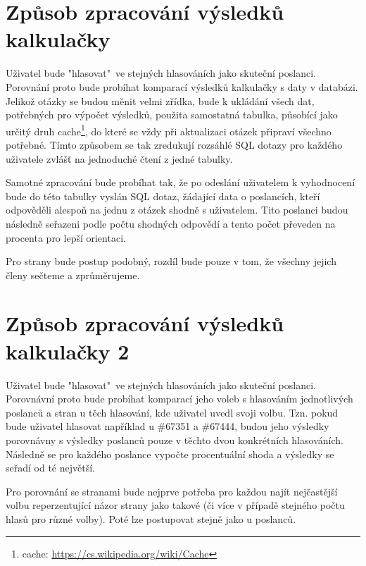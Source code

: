 \section{Způsob zpracování výsledků kalkulačky}
Uživatel bude "hlasovat"\ ve stejných hlasováních jako skuteční poslanci. Porovnání proto bude probíhat komparací výsledků kalkulačky s daty v databázi. Jelikož otázky se budou měnit velmi zřídka, bude k ukládání všech dat, potřebných pro výpočet výsledků, použita samostatná tabulka, působící jako určitý druh cache\footnote{cache: \url{https://cs.wikipedia.org/wiki/Cache}}, do které se vždy při aktualizaci otázek připraví všechno potřebné. Tímto způsobem se tak zredukují rozsáhlé SQL dotazy pro každého uživatele zvlášť na jednoduché čtení z jedné tabulky. 
\par Samotné zpracování bude probíhat tak, že po odeslání uživatelem k vyhodnocení bude do této tabulky vyslán SQL dotaz, žádající data o poslancích, kteří odpověděli alespoň na jednu z otázek shodně s uživatelem. Tito poslanci budou následně seřazeni podle počtu shodných odpovědí a tento počet převeden na procenta pro lepší orientaci. 
\par Pro strany bude postup podobný, rozdíl bude pouze v tom, že všechny jejich členy sečteme a zprůměrujeme.

\section{Způsob zpracování výsledků kalkulačky 2}
Uživatel bude "hlasovat"\ ve stejných hlasováních jako skuteční poslanci. Porovnávní proto bude probíhat komparací jeho voleb s hlasováním jednotlivých poslanců a stran u těch hlasování, kde uživatel uvedl svoji volbu. Tzn. pokud bude uživatel hlasovat například u \#67351 a \#67444, budou jeho výsledky porovnávny s výsledky poslanců pouze v těchto dvou konkrétních hlasováních. Následně se pro každého poslance vypočte procentuální shoda a výsledky se seřadí od té největší.

\par Pro porovnání se stranami bude nejprve potřeba pro každou najít nejčastější volbu reperzentující názor strany jako takové (či více v případě stejného počtu hlasů pro různé volby). Poté lze postupovat stejně jako u poslanců.





